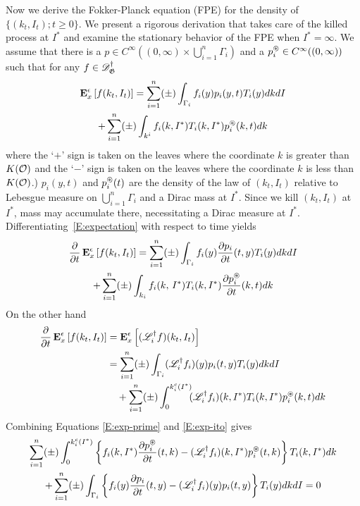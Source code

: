 Now we derive the Fokker-Planck equation (FPE) for the density of $\{(k_t, I_t); t \ge 0\}$. We present a rigorous derivation that takes care of the killed process at $I^*$ and examine the stationary behavior of the FPE when $I^*= \infty$. We assume that there is a $p\in C^\infty((0,\infty)\times \bigcup_{i=1}^n \Gamma_i )$ and a $p_{i}^\circledast\in C^\infty((0,\infty))$ such that for any $f\in \mathscr{D}_\mathfrak G^\dag$
\begin{multline}
\label{E:expectation}
\operatorname{\mathbf E}^\epsilon_x \left[f(k_t, I_t) \right] = \sum_{i=1}^n (\pm) \int_{\Gamma_i} f_i(y) p_i(y,t) T_i(y) dk dI\\
+ \sum_{i=1}^n (\pm) \int_{k^i} f_i(k,I^*) T_{i}(k,I^*) p_i^\circledast(k,t) dk
\end{multline}
where the `$+$' sign is taken on the leaves where the coordinate $k$ is greater than $K({\mathcal O})$ and the `$-$' sign is taken on the leaves where the coordinate $k$ is less than $K({\mathcal O})$.) $p_i(y,t)$ and $p_{i}^\circledast(t)$ are the density of the law of $(k_t, I_t)$ relative to Lebesgue measure on $\bigcup_{i=1}^n \Gamma_i$ and a Dirac mass at $I^*$. Since we kill $(k_t, I_t)$ at $I^*$, mass may accumulate there, necessitating a Dirac measure at $I^*$.
Differentiating~\eqref{E:expectation} with respect to time yields
\begin{multline}
\label{E:exp-prime}
\frac{\partial}{\partial t} \operatorname{\mathbf E}^\epsilon_x\left[ f(k_t, I_t) \right] = \sum_{i=1}^n (\pm) \int_{\Gamma_i} f_i(y) \frac{\partial p_i}{\partial t}(t,y) T_i(y) dk dI\\
+ \sum_{i=1}^n (\pm) \int_{k_i} f_{i}(k,\,I^*) T_{i}(k,I^*)  \frac{\partial p_i^\circledast}{\partial t}(k,t) dk
\end{multline}
On the other hand
\begin{equation}
\begin{aligned}
\frac{\partial}{\partial t} \operatorname{\mathbf E}^\epsilon_x\left[f(k_t ,I_t) \right] &= \operatorname{\mathbf E}^\epsilon_x\left[(\mathscr L^\dagger_i f)(k_t, I_t) \right]\\
&= \sum_{i=1}^n (\pm) \int_{\Gamma_i} (\mathscr L^\dagger_i f_{i})(y) p_{i}(t,y) T_{i}(y) dk dI\\
&\quad + \sum_{i=1}^n (\pm) \int_{0}^{k_{i}^{c}(I^*)}\!\! (\mathscr L^\dagger_i f_i)(k,I^*) T_i(k,I^*) p_{i}^\circledast(k,t) dk
\end{aligned}
\label{E:exp-ito}
\end{equation}
Combining Equations \eqref{E:exp-prime} and \eqref{E:exp-ito} gives
\begin{multline}
\sum_{i=1}^n (\pm) \int_{0}^{k_{i}^{c}(I^*)} \left\{f_i(k,I^*) \frac{\partial p_i^\circledast}{\partial t}(t,k) - (\mathscr L^\dagger_i f_i)(k,I^*) p_i^\circledast(t,k) \right\} T_{i}(k,I^*) dk\\
+ \sum_{i=1}^n (\pm) \int_{\Gamma_i} \left\{f_i(y) \frac{\partial p_i}{\partial t}(t,y) - (\mathscr L^\dagger_i f_i)(y) p_{i}(t,y) \right\} T_i(y) dk dI = 0
\label{E:step0}
\end{multline}

